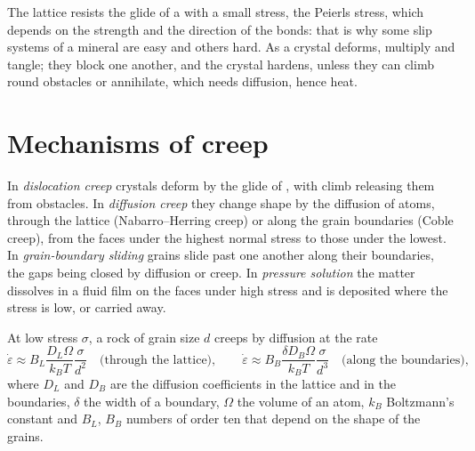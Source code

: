The lattice resists the glide of a  with a small stress, the
Peierls stress, which depends on the strength and the direction of the bonds:
that is why some slip systems of a mineral are easy and others hard. As a
crystal deforms,  multiply and tangle; they block one another, and
the crystal hardens, unless they can climb round obstacles or annihilate, which
needs diffusion, hence heat.

\section{Mechanisms of creep}

\begin{definition}\label{def:b3:deformation-mechanisms:creep}
In \emph{dislocation creep} crystals deform by the
glide of , with climb releasing them from obstacles. In
\emph{diffusion creep} they change shape by the
diffusion of atoms, through the lattice (Nabarro--Herring creep) or along the
grain boundaries (Coble creep), from the faces under the highest normal stress
to those under the lowest. In \emph{grain-boundary sliding}
grains slide past one another along their boundaries, the gaps being
closed by diffusion or  creep. In \emph{pressure
solution} the matter dissolves in a fluid film on the
faces under high stress and is deposited where the stress is low, or carried
away.
\end{definition}

\begin{proposition}\label{prop:b3:deformation-mechanisms:grain-size}
At low stress $\sigma$, a rock of grain size $d$ creeps by diffusion at the rate
\[
  \dot\varepsilon \approx B_L\frac{D_L\Omega}{k_BT}\frac{\sigma}{d^2}
  \quad\text{(through the lattice)},\qquad
  \dot\varepsilon \approx B_B\frac{\delta D_B\Omega}{k_BT}\frac{\sigma}{d^3}
  \quad\text{(along the boundaries)},
\]
where $D_L$ and $D_B$ are the diffusion coefficients in the lattice and in the
boundaries, $\delta$ the width of a boundary, $\Omega$ the volume of an atom,
$k_B$ Boltzmann's constant and $B_L$, $B_B$ numbers of order ten that depend on
the shape of the grains.
\end{proposition}

